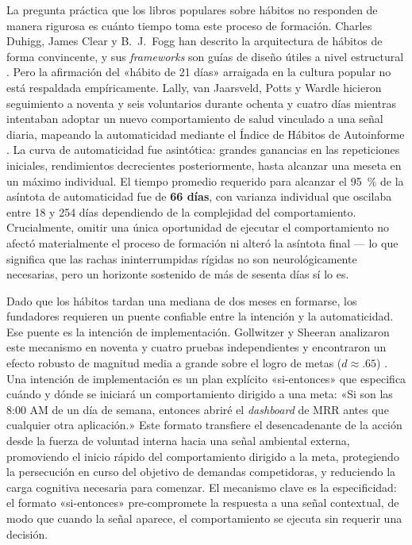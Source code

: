 La pregunta práctica que los libros populares sobre hábitos no responden de manera rigurosa es
cuánto tiempo toma este proceso de formación. Charles Duhigg, James Clear y B.\ J.\ Fogg han
descrito la arquitectura de hábitos de forma convincente, y sus \emph{frameworks} son guías de
diseño útiles a nivel estructural \parencite{duhigg2012power,clear2018atomic,fogg2020tiny}. Pero
la afirmación del «hábito de 21 días» arraigada en la cultura popular no está respaldada
empíricamente. Lally, van Jaarsveld, Potts y Wardle hicieron seguimiento a noventa y seis
voluntarios durante ochenta y cuatro días mientras intentaban adoptar un nuevo comportamiento de
salud vinculado a una señal diaria, mapeando la automaticidad mediante el Índice de Hábitos de
Autoinforme \parencite{lally2010habit}. %
La curva de automaticidad fue asintótica: grandes ganancias en las repeticiones iniciales,
rendimientos decrecientes posteriormente, hasta alcanzar una meseta en un máximo individual.
El tiempo promedio requerido para alcanzar el \qty{95}{\percent} de la asíntota de automaticidad
fue de \textbf{66 días}, con varianza individual que oscilaba entre 18 y 254 días dependiendo
de la complejidad del comportamiento. Crucialmente, omitir una única oportunidad de ejecutar el
comportamiento no afectó materialmente el proceso de formación ni alteró la asíntota final ---
lo que significa que las rachas ininterrumpidas rígidas no son neurológicamente necesarias, pero
un horizonte sostenido de más de sesenta días sí lo es.

Dado que los hábitos tardan una mediana de dos meses en formarse, los fundadores requieren un
puente confiable entre la intención y la automaticidad. Ese puente es la intención de
implementación. Gollwitzer y Sheeran analizaron este mecanismo en noventa y cuatro pruebas
independientes y encontraron un efecto robusto de magnitud media a grande sobre el logro de
metas ($d \approx .65$) \parencite{gollwitzer2006implementation}.
Una intención de implementación es un plan explícito «si-entonces» que especifica cuándo y
dónde se iniciará un comportamiento dirigido a una meta: «Si son las 8:00 AM de un día de
semana, entonces abriré el \emph{dashboard} de MRR antes que cualquier otra aplicación.» Este
formato transfiere el desencadenante de la acción desde la fuerza de voluntad interna hacia una
señal ambiental externa, promoviendo el inicio rápido del comportamiento dirigido a la meta,
protegiendo la persecución en curso del objetivo de demandas competidoras, y reduciendo la carga
cognitiva necesaria para comenzar. El mecanismo clave es la especificidad: el formato «si-entonces»
pre-compromete la respuesta a una señal contextual, de modo que cuando la señal aparece, el
comportamiento se ejecuta sin requerir una decisión.

